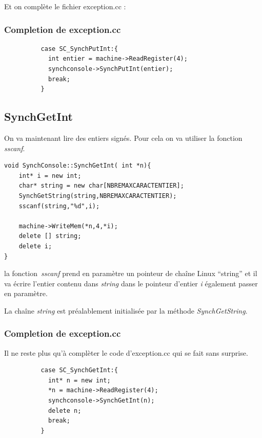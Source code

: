 \documentclass[a4paper,10pt]{report}
\begin{document}
    Et on complète le fichier exception.cc :
    \textcolor{TealBlue}{\subsubsection*{Completion de exception.cc}}
    \begin{lstlisting}
          case SC_SynchPutInt:{
            int entier = machine->ReadRegister(4);
            synchconsole->SynchPutInt(entier);
            break;
          }     
    \end{lstlisting}

    \textcolor{NavyBlue}{\subsection{SynchGetInt}}
    On va maintenant lire des entiers signés. Pour cela on va utiliser la fonction \emph{sscanf}. 
    \begin{lstlisting}
void SynchConsole::SynchGetInt( int *n){
	int* i = new int;
	char* string = new char[NBREMAXCARACTENTIER];
	SynchGetString(string,NBREMAXCARACTENTIER);
	sscanf(string,"%d",i);

	machine->WriteMem(*n,4,*i);
	delete [] string;
	delete i;
}      
    \end{lstlisting}
    la fonction \emph{sscanf} prend en paramètre un pointeur de chaîne Linux ``string'' et il va écrire l'entier contenu dans \emph{string} dans le pointeur 
    d'entier \emph{i} également passer en paramètre.
    
    La chaîne \emph{string} est préalablement initialisée par la méthode \emph{SynchGetString}.
    
    \textcolor{TealBlue}{\subsubsection*{Completion de exception.cc}}
    Il ne reste plus qu'à complèter le code d'exception.cc qui se fait sans surprise.
    \begin{lstlisting}
          case SC_SynchGetInt:{
            int* n = new int;
            *n = machine->ReadRegister(4);
            synchconsole->SynchGetInt(n);
            delete n;
            break;
          }     
    \end{lstlisting}
    
\end{document}

